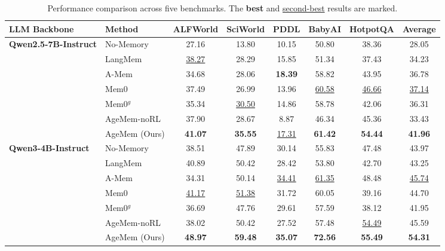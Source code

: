 \usepackage{colortbl} %

\begin{table}[t]
\centering
\small
\caption{Performance comparison across five benchmarks. The \textbf{best} and \underline{second-best} results are marked.}
\label{tab:main_results}
\setlength{\tabcolsep}{6pt}
\begin{tabular}{@{}l|l|@{\hspace{6pt}}ccccc@{\hspace{6pt}}|c@{}}
\toprule
\textbf{LLM Backbone} & \textbf{Method} & \textbf{ALFWorld} & \textbf{SciWorld} & \textbf{PDDL} & \textbf{BabyAI} & \textbf{HotpotQA} & \textbf{Average} \\
\midrule
\multirow{7}{*}{\textbf{Qwen2.5-7B-Instruct}}
& No-Memory & 27.16 & 13.80 & 10.15 & 50.80 & 38.36 & 28.05 \\
& LangMem & \underline{38.27} & 28.29 & 15.85 & 51.34 & 37.43 & 34.23 \\
& A-Mem & 34.68 & 28.06 & \textbf{18.39} & 58.82 & 43.95 & 36.78 \\
& Mem0 & 37.49 & 26.99 & 13.96 & \underline{60.58} & \underline{46.66} & \underline{37.14} \\
& Mem0$^{g}$ & 35.34 & \underline{30.50} & 14.86 & 58.78 & 42.06 & 36.31 \\
& \cellcolor{gray!15}AgeMem-noRL & \cellcolor{gray!15}37.90 & \cellcolor{gray!15}28.67 & \cellcolor{gray!15}8.87 & \cellcolor{gray!15}46.34 & \cellcolor{gray!15}45.36 & \cellcolor{gray!15}33.43 \\
& \cellcolor{gray!15}AgeMem (Ours) & \cellcolor{gray!15}\textbf{41.07} & \cellcolor{gray!15}\textbf{35.55} & \cellcolor{gray!15}\underline{17.31} & \cellcolor{gray!15}\textbf{61.42} & \cellcolor{gray!15}\textbf{54.44} & \cellcolor{gray!15}\textbf{41.96} \\
\midrule
\multirow{7}{*}{\textbf{Qwen3-4B-Instruct}}
& No-Memory & 38.51 & 47.89 & 30.14 & 55.83 & 47.48 & 43.97 \\
& LangMem & 40.89 & 50.42 & 28.42 & 53.80 & 42.70 & 43.25 \\
& A-Mem & 34.31 & 50.14 & \underline{34.41} & \underline{61.35} & 48.48 & \underline{45.74} \\
& Mem0 & \underline{41.17} & \underline{51.38} & 31.72 & 60.05 & 39.16 & 44.70\\
& Mem0$^{g}$ & 36.69 & 47.76 & 29.61 & 57.59 & 38.12 & 41.95 \\
& \cellcolor{gray!15}AgeMem-noRL & \cellcolor{gray!15}38.02 & \cellcolor{gray!15}50.42 & \cellcolor{gray!15}27.52 & \cellcolor{gray!15}57.48 & \cellcolor{gray!15}\underline{54.49} & \cellcolor{gray!15}45.59 \\
& \cellcolor{gray!15}AgeMem (Ours) & \cellcolor{gray!15}\textbf{48.97} & \cellcolor{gray!15}\textbf{59.48} & \cellcolor{gray!15}\textbf{35.07} & \cellcolor{gray!15}\textbf{72.56} & \cellcolor{gray!15}\textbf{55.49} & \cellcolor{gray!15}\textbf{54.31} \\
\bottomrule
\end{tabular}
\vspace{-0.3cm}
\end{table}
